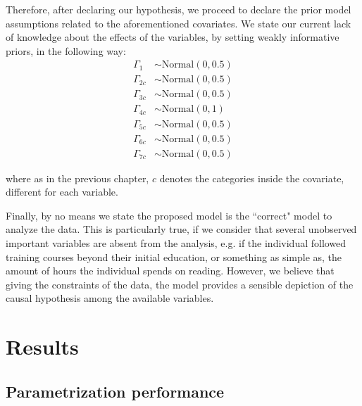 Therefore, after declaring our hypothesis, we proceed to declare the prior model assumptions related to the aforementioned covariates. We state our current lack of knowledge about the effects of the variables, by setting weakly informative priors, in the following way: 
%
\begin{align}
	\Gamma_{1} &\sim \text{Normal}( 0, 0.5 ) \\
	\Gamma_{2c} &\sim \text{Normal}( 0, 0.5 ) \\
	\Gamma_{3c} &\sim \text{Normal}( 0, 0.5 ) \\
	\Gamma_{4c} &\sim \text{Normal}( 0, 1 ) \\
	\Gamma_{5c} &\sim \text{Normal}( 0, 0.5 ) \\
	\Gamma_{6c} &\sim \text{Normal}( 0, 0.5 )  \\
	\Gamma_{7c} &\sim \text{Normal}( 0, 0.5 ) 
\end{align} 

\noindent where as in the previous chapter, $c$ denotes the categories inside the covariate, different for each variable. 

Finally, by no means we state the proposed model is the ``correct" model to analyze the data. This is particularly true, if we consider that several unobserved important variables are absent from the analysis, e.g. if the individual followed training courses beyond their initial education, or something as simple as, the amount of hours the individual spends on reading. However, we believe that giving the constraints of the data, the model provides a sensible depiction of the causal hypothesis among the available variables.


\section{Results}


\subsection{Parametrization performance}

